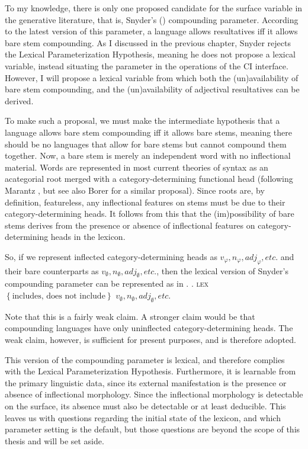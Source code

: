 \documentclass[MilwayThesis]{subfiles}
\begin{document}
To my knowledge, there is only one proposed candidate for the surface variable in the generative literature, that is, Snyder's (\citeyear{snyder1995language,snyder2012parameter}) compounding parameter.
According to the latest version of this parameter, a language allows resultatives iff it allows bare stem compounding.
As I discussed in the previous chapter, Snyder rejects the Lexical Parameterization Hypothesis, meaning he does not propose a lexical variable, instead situating the parameter in the operations of the CI interface.
However, I will propose a lexical variable from which both the (un)availability of bare stem compounding, and the (un)availability of adjectival resultatives can be derived.

To make such a proposal, we must make the intermediate hypothesis that a language allows bare stem compounding iff it allows bare stems, meaning there should be no languages that allow for bare stems but cannot compound them together.
Now, a bare stem is merely an independent word with no inflectional material.
Words are represented in most current theories of syntax as an acategorial root merged with a category-determining functional head (following Marantz \citeyear{marantz1997no}, but see also Borer \citeyear{borer2005name} for a similar proposal).
Since roots are, by definition, featureless, any inflectional features on stems must be due to their category-determining heads.
It follows from this that the (im)possibility of bare stems derives from the presence or absence of inflectional features on category-determining heads in the lexicon.

So, if we represent inflected category-determining heads as $v_\varphi, n_\varphi, adj_\varphi, etc.$ and their bare counterparts as $v_\emptyset, n_\emptyset, adj_\emptyset, etc.$, then the lexical version of Snyder's compounding parameter can be represented as in \Next.
\ex. \textsc{lex} $\left\{ \text{includes, does not include} \right\}$ $v_\emptyset, n_\emptyset, adj_\emptyset, etc.$

Note that this is a fairly weak claim.
A stronger claim would be that compounding languages have only uninflected category-determining heads.
The weak claim, however, is sufficient for present purposes, and is therefore adopted.

This version of the compounding parameter is lexical, and therefore complies with the Lexical Parameterization Hypothesis.
Furthermore, it is learnable from the primary linguistic data, since its external manifestation is the presence or absence of inflectional morphology.
Since the inflectional morphology is detectable on the surface, its absence must also be detectable or at least deducible.
This leaves us with questions regarding the initial state of the lexicon, and which parameter setting is the default, but those questions are beyond the scope of this thesis and will be set aside.
\end{document}
